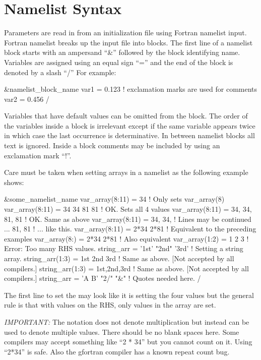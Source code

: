 \section{Namelist Syntax}
\label{s:format}

Parameters are read in from an initialization file using Fortran namelist input. Fortran namelist
breaks up the input file into blocks. The first line of a namelist block starts with an ampersand
``\&'' followed by the block identifying name. Variables are assigned using an equal sign ``='' and
the end of the block is denoted by a slash ``/'' For example:
\begin{example}
  &namelist_block_name
    var1 = 0.123   ! exclamation marks are used for comments
    var2 = 0.456
  /
\end{example}
Variables that have default values can be omitted from the block.  The order of the variables inside
a block is irrelevant except if the same variable appears twice in which case the last occurrence is
determinative.  In between namelist blocks all text is ignored. Inside a block comments may be
included by using an exclamation mark ``!''.

Care must be taken when setting arrays in a namelist as the following example shows:
\begin{example}
  &some_namelist_name
    var_array(8:11) = 34             ! Only sets var_array(8)
    var_array(8:11) = 34 34 81 81    ! OK. Sets all 4 values
    var_array(8:11) = 34, 34, 81, 81 ! OK. Same as above
    var_array(8:11) = 34, 34,        ! Lines may be continued ...
                      81, 81         !   ... like this.
    var_array(8:11) = 2*34 2*81      ! Equivalent to the preceding examples
    var_array(8:)   = 2*34 2*81      ! Also equivalent
    var_array(1:2) = 1 2 3           ! Error: Too many RHS values.
    string_arr = '1st' "2nd" '3rd'   ! Setting a string array.
    string_arr(1:3) = 1st 2nd 3rd    ! Same as above. [Not accepted by all compilers.]
    string_arr(1:3) = 1st,2nd,3rd    ! Same as above. [Not accepted by all compilers.]
    string_arr = 'A B' "2/" "&"      ! Quotes needed here.
  /
\end{example}
The first line to set the  may look like it is setting the four values
 but the general rule is that with  values on the RHS, only  values
in the array are set.

{\em IMPORTANT:} The notation  does not denote multiplication but instead can be used to
denote multiple values. There should be no blank spaces here. Some compilers may accept something
like ``2 * 34'' but you cannot count on it. Using ``2*34'' is safe. Also the gfortran compiler has a known
repeat count bug.


